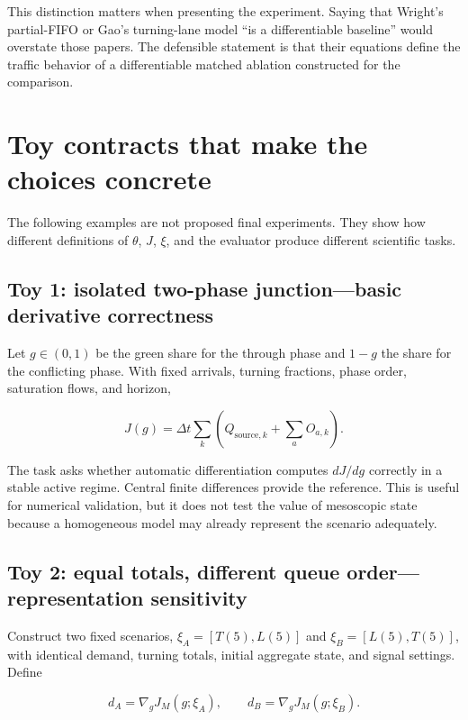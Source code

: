 \documentclass[11pt,a4paper]{article}
\begin{document}
This distinction matters when presenting the experiment. Saying that Wright's partial-FIFO or Gao's turning-lane model ``is a differentiable baseline'' would overstate those papers. The defensible statement is that their equations define the traffic behavior of a differentiable matched ablation constructed for the comparison.

\section{Toy contracts that make the choices concrete}

The following examples are not proposed final experiments. They show how different definitions of $\theta$, $J$, $\xi$, and the evaluator produce different scientific tasks.

\subsection{Toy 1: isolated two-phase junction---basic derivative correctness}

Let $g\in(0,1)$ be the green share for the through phase and $1-g$ the share for the conflicting phase. With fixed arrivals, turning fractions, phase order, saturation flows, and horizon,

\begin{equation}
  J(g)=\Delta t\sum_k\left(Q_{\mathrm{source},k}
  +\sum_a O_{a,k}\right).
\end{equation}

The task asks whether automatic differentiation computes $dJ/dg$ correctly in a stable active regime. Central finite differences provide the reference. This is useful for numerical validation, but it does not test the value of mesoscopic state because a homogeneous model may already represent the scenario adequately.

\subsection{Toy 2: equal totals, different queue order---representation sensitivity}

Construct two fixed scenarios, $\xi_A=[T(5),L(5)]$ and $\xi_B=[L(5),T(5)]$, with identical demand, turning totals, initial aggregate state, and signal settings. Define

\begin{equation}
 d_A=\nabla_gJ_M(g;\xi_A),\qquad
 d_B=\nabla_gJ_M(g;\xi_B).
\end{equation}
\end{document}
